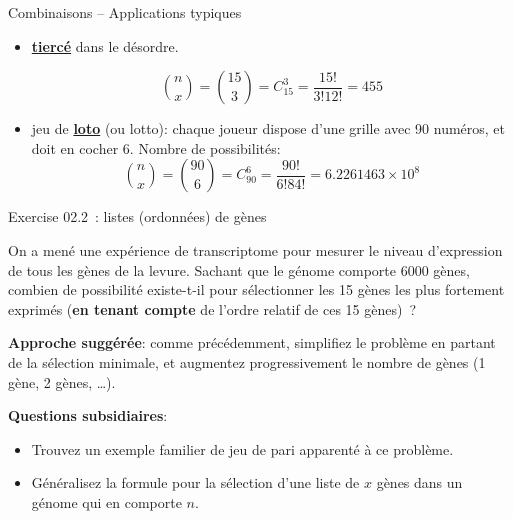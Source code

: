 \documentclass[ignorenonframetext,]{beamer}
\providecommand{\tightlist}{%
  \setlength{\itemsep}{0pt}\setlength{\parskip}{0pt}}
\begin{document}
\begin{frame}{Combinaisons -- Applications typiques}
\protect\hypertarget{combinaisons-applications-typiques}{}

\begin{itemize}
\item
  \textbf{\href{https://fr.wikipedia.org/wiki/Tierc\%C3\%A9_(jeu)}{tiercé}}
  dans le désordre.

  \[\binom{n}{x} = \binom{15}{3} = C^3_{15} = \frac{15!}{3! 12!} = 455\]
\item
  jeu de \textbf{\href{https://fr.wikipedia.org/wiki/Loto}{loto}} (ou
  lotto): chaque joueur dispose d'une grille avec 90 numéros, et doit en
  cocher 6. Nombre de possibilités:
  \[\binom{n}{x} = \binom{90}{6} = C^6_{90} = \frac{90!}{6! 84!} = \ensuremath{6.2261463\times 10^{8}}\]
\end{itemize}

\end{frame}

\begin{frame}{Exercise 02.2~: listes (ordonnées) de gènes}
\protect\hypertarget{exercise-02.2-listes-ordonnees-de-genes}{}

On a mené une expérience de transcriptome pour mesurer le niveau
d'expression de tous les gènes de la levure. Sachant que le génome
comporte 6000 gènes, combien de possibilité existe-t-il pour
sélectionner les 15 gènes les plus fortement exprimés (\textbf{en tenant
compte} de l'ordre relatif de ces 15 gènes)~?

\textbf{Approche suggérée}: comme précédemment, simplifiez le problème
en partant de la sélection minimale, et augmentez progressivement le
nombre de gènes (1 gène, 2 gènes, \ldots{}).

\textbf{Questions subsidiaires}:

\begin{itemize}
\tightlist
\item
  Trouvez un exemple familier de jeu de pari apparenté à ce problème.
\item
  Généralisez la formule pour la sélection d'une liste de \(x\) gènes
  dans un génome qui en comporte \(n\).
\end{itemize}

\end{frame}
\end{document}
